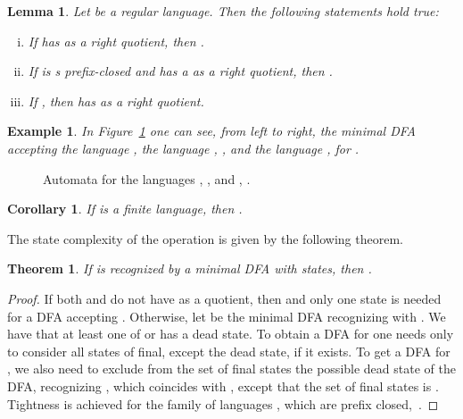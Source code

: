 \documentclass{article}
\newtheorem{lemma}{Lemma}
\newtheorem{theorem}{Theorem}
\newtheorem{corollary}{Corollary}
\newtheorem{example}{Example}
\newcommand{\dfa}{DFA\xspace}
\begin{document}
\begin{lemma}
\label{lem:prelemma}
Let  be a regular language. Then the following statements hold true:
\begin{enumerate}[i)] 
\item If  has  as a right quotient, then  .
\item If  is s prefix-closed and   has a  as a right quotient, then .
\item If  , then  has  as a right quotient.
\end{enumerate}
\end{lemma}
\begin{example}
\label{ex:prefe2}
In Figure~\ref{fig:prefe2} one can see, from left to right, the minimal  \dfa accepting the language , 
the language , , and the language , for .
\end{example}

\begin{figure}[h!]
\begin{center}
\quad\quad{} \end{center}
\caption{Automata for the languages , , and , .}

\label{fig:prefe2} 
\end{figure}



\begin{corollary}
\label{cor:dprefinite}
  If  is a finite language, then .
\end{corollary}

The state complexity of the  operation is given by the following theorem.
\begin{theorem}
\label{theo:scdpre}
If  is recognized by a minimal \dfa with  states, then
 .
\end{theorem}
\begin{proof}
 If both  and  do not have  as a quotient, then  
and only one state is needed for a \dfa accepting . 
Otherwise, let  be the minimal \dfa recognizing  with .
We have that at least one of  or  has a dead state. 
To obtain a \dfa for  one needs only to  consider all states of  final, except the dead state, if it exists. 
To get a \dfa for , we also need to exclude from the set of final states the possible dead state of the \dfa , recognizing , which coincides with , except that the set of final states is . Tightness is achieved  for the family of languages , which are prefix closed,~\cite{brzozowski14:_quotien_compl_of_closed_languag}.\end{proof}
\end{document}
